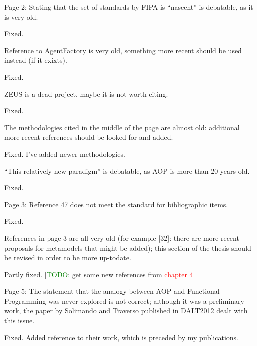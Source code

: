 \documentclass{article}
\newcommand*\R[1]{\textcolor{red}{#1}} %
\newcommand{\todo}[1]{[\textcolor{green}{TODO}: #1]}
\newenvironment{them}{\noindent\begingroup\color{blue}}{\endgroup\par}
\begin{document}
\begin{them}

Page 2:
Stating that the set of standards by FIPA is ``nascent'' is debatable, as it is
very old.

\end{them}
Fixed.

\begin{them}

Reference to AgentFactory is very old, something more recent should be used
instead (if it exixts).

\end{them}
Fixed.

\begin{them}

ZEUS is a dead project, maybe it is not worth citing.
\end{them}
Fixed.

\begin{them}

The methodologies cited in the middle of the page are almost old: additional
more recent references should be looked for and added.

\end{them}
Fixed. I've added newer methodologies.

\begin{them}

``This relatively new paradigm'' is debatable, as AOP is more than 20 years old.
\end{them}
Fixed.

\begin{them}

Page 3:
Reference 47 does not meet the standard for bibliographic items.

\end{them}
Fixed.

\begin{them}

References in page 3 are all very old (for example [32]: there are more recent
proposals for metamodels that might be added); this section of the thesis
should be revised in order to be more up-todate.

\end{them}
Partly fixed.
\todo{get some new references from \R{chapter 4}}

\begin{them}

Page 5:
The statement that the analogy between AOP and Functional Programming was never
explored is not correct; although it was a preliminary work, the paper by
Solimando and Traverso published in DALT2012 dealt with this issue.

\end{them}
Fixed. Added reference to their work, which is preceded by my publications.
\end{document}
